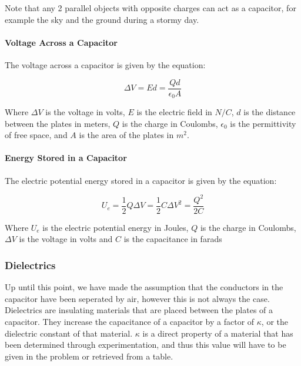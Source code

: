Note that any 2 parallel objects with opposite charges can act as a capacitor, for example the sky and the ground during a stormy day.


\paragraph*{Voltage Across a Capacitor}
The voltage across a capacitor is given by the equation:

\begin{equation*}
    \Delta V = Ed = \frac{Qd}{\epsilon_0 A}
\end{equation*}

Where $\Delta V$ is the voltage in volts, $E$ is the electric field in $N/C$, $d$ is the distance between the plates in meters, $Q$ is the charge in Coulombs, $\epsilon_0$ is the permittivity of free space, and $A$ is the area of the plates in $m^2$.\\


\paragraph*{Energy Stored in a Capacitor}
The electric potential energy stored in a capacitor is given by the equation:

\begin{equation*}
    U_e = \frac{1}{2}Q\Delta V = \frac{1}{2}C\Delta V^2 = \frac{Q^2}{2C}
\end{equation*}

Where $U_e$ is the electric potential energy in Joules, $Q$ is the charge in Coulombs, $\Delta V$ is the voltage in volts and $C$ is the capacitance in farads\\

\hrulefill


\subsubsection*{Dielectrics}

\hspace{.5cm} Up until this point, we have made the assumption that the conductors in the capacitor have been seperated by air, however this is not always the case. Dielectrics are insulating materials that are placed between the plates of a capacitor. 
They increase the capacitance of a capacitor by a factor of $\kappa$, or the dielectric constant of that material. $\kappa$ is a direct property of a material that has been determined through experimentation, and thus this value will have to be given
in the problem or retrieved from a table.

